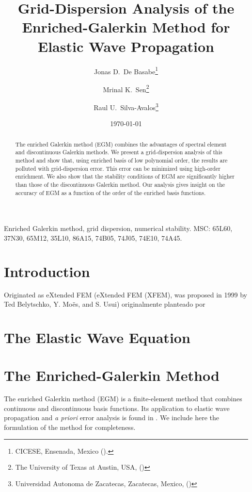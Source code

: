 \documentclass[review,hidelinks,onefignum,onetabnum]{siamart220329}
\title{Grid-Dispersion Analysis of the Enriched-Galerkin Method for Elastic Wave Propagation}
\author{Jonas D.~De Basabe\thanks{CICESE, Ensenada, Mexico 
  (\email{jonas@cicese.mx}).}
\and Mrinal K.~Sen\thanks{The University of Texas at Austin, USA, (\email{mrinal@utexas.edu})}
\and Raul U.~Silva-Avalos\thanks{Universidad Autonoma de Zacatecas, Zacatecas, Mexico, (\email{rsilva@uaz.edu.mx})}
}
\date{\today}
\begin{document}
\maketitle

\begin{abstract}
The enriched Galerkin method (EGM) combines the advantages of spectral element and discontinuous Galerkin methods. 
We present a grid-dispersion analysis of this method and show that, using enriched basis of low polynomial order, the results are polluted with grid-dispersion error. This error can be minimized using high-order enrichment.
We also show that the stability conditions of EGM are significantly higher than those of the discontinuous Galerkin method.
Our analysis gives insight on the accuracy of EGM as a function of the order of the enriched basis functions.
\end{abstract}

\begin{keywords}
Enriched Galerkin method, grid dispersion, numerical stability.
MSC: 65L60, 37N30, 65M12, 35L10, 86A15, 74B05, 74J05, 74E10, 74A45.
\end{keywords}


\section{Introduction}

Originated as eXtended FEM (eXtended FEM (XFEM), was proposed in 1999 by Ted Belytschko, Y. Moës, and S. Usui)
originalmente planteado por \cite{SuLi09}

\section{The Elastic Wave Equation}


\section{The Enriched-Galerkin Method}

The enriched Galerkin method (EGM) is a finite-element method that combines continuous and discontinuous basis functions. Its application to elastic wave propagation and \textit{a priori} error analysis is found in \cite{VaDeSeWh18}. We include here the formulation of the method for completeness.
\end{document}
